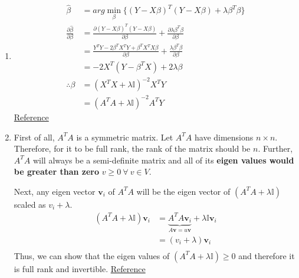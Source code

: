 \begin{enumerate}


	\item 
		\begin{align*}
    		\hat{\beta} & = arg\min_{\beta} \{ (Y - X\beta)^{T}(Y - X\beta) + \lambda \beta^{T}\beta \} \\
    		\frac{\partial\hat{\beta}}{\partial\beta} & = \frac{\partial(Y - X\beta)^{T}(Y - X\beta)}{\partial\beta} + \frac{\partial\lambda\beta^{T}\beta}{\partial\beta} \\
    		& = \frac{Y^{T}Y - 2\beta^{T}X^{T}Y + \beta^{T}X^{T}X\beta}{\partial\beta} + \frac{\lambda\beta^{T}\beta}{\partial\beta} \\
    		& = -2X^{T}(Y - \beta^{T}X) + 2\lambda\beta \\
    		\therefore \beta & = (X^{T}X + \lambda \mathbb{I})^{-2}X^{T}Y \\
    		& = (A^{T}A + \lambda \mathbb{I})^{-2}A^{T}Y
		\end{align*}
		\href{https://stats.stackexchange.com/questions/69205/how-to-derive-the-ridge-regression-solution}{Reference}
		
					
	\item First of all, $A^{T}A$ is a symmetric matrix. Let $A^{T}A$ have dimensions $n \times n$. Therefore, for it to be full rank, the rank of the matrix should be $n$. Further, $A^{T}A$ will always be a semi-definite matrix and all of its \textbf{eigen values would be greater than zero} $v \geq 0 \ \forall \ v \in V$. 
		\par
		Next, any eigen vector $\textbf{v}_{i}$ of $A^{T}A$ will be the eigen vector of $(A^{T}A + \lambda\mathbb{I})$ scaled as $v_{i} + \lambda$.
		\begin{align*}
    		(A^{T}A + \lambda\mathbb{I})\textbf{v}_{i} & = \underbrace{A^{T}A\textbf{v}_{i}}_{A\textbf{v} = u\textbf{v}} + \lambda\mathbb{I} \textbf{v}_{i} \\
    		& = (v_{i} + \lambda)\textbf{v}_{i} \\
		\end{align*}
		Thus, we can show that the eigen values of $(A^{T}A + \lambda\mathbb{I}) \geq0$ and therefore it is full rank and invertible. \href{https://statisticaloddsandends.wordpress.com/2018/01/31/xtx-is-always-positive-semidefinite/}{Reference}
	
	
\end{enumerate}
